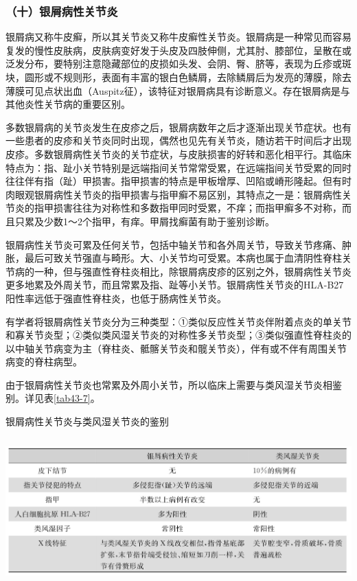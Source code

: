 \subsubsection{（十）银屑病性关节炎}

银屑病又称牛皮癣，所以其关节炎又称牛皮癣性关节炎。银屑病是一种常见而容易复发的慢性皮肤病，皮肤病变好发于头皮及四肢伸侧，尤其肘、膝部位，呈散在或泛发分布，要特别注意隐藏部位的皮损如头发、会阴、臀、脐等，表现为丘疹或斑块，圆形或不规则形，表面有丰富的银白色鳞屑，去除鳞屑后为发亮的薄膜，除去薄膜可见点状出血（Auspitz征），该特征对银屑病具有诊断意义。存在银屑病是与其他炎性关节病的重要区别。

多数银屑病的关节炎发生在皮疹之后，银屑病数年之后才逐渐出现关节症状。也有一些患者的皮疹和关节炎同时出现，偶然也见先有关节炎，随访若干时间后才出现皮疹。多数银屑病性关节炎的关节症状，与皮肤损害的好转和恶化相平行。其临床特点为：指、趾小关节特别是远端指间关节常常受累，在远端指间关节受累的同时往往伴有指（趾）甲损害。指甲损害的特点是甲板增厚、凹陷或嵴形隆起。但有时肉眼观银屑病性关节炎的指甲损害与指甲癣不易区别，其特点之一是：银屑病性关节炎的指甲损害往往为对称性和多数指甲同时受累，不痒；而指甲癣多不对称，而且只累及少数1～2个指甲，有痒。甲屑找癣菌有助于鉴别诊断。

银屑病性关节炎可累及任何关节，包括中轴关节和各外周关节，导致关节疼痛、肿胀，最后可致关节强直与畸形。大、小关节均可受累。本病也属于血清阴性脊柱关节病的一种，但与强直性脊柱炎相比，除银屑病皮疹的区别之外，银屑病性关节炎更多地累及外周关节，而且常累及指、趾等小关节。银屑病性关节炎的HLA-B27阳性率远低于强直性脊柱炎，也低于肠病性关节炎。

有学者将银屑病性关节炎分为三种类型：①类似反应性关节炎伴附着点炎的单关节和寡关节炎型；②类似类风湿关节炎的对称性多关节炎型；③类似强直性脊柱炎的以中轴关节病变为主（脊柱炎、骶髂关节炎和髋关节炎），伴有或不伴有周围关节病变的脊柱病型。

由于银屑病性关节炎也常累及外周小关节，所以临床上需要与类风湿关节炎相鉴别。详见表\ref{tab43-7}。

\begin{table}[htbp]
\centering
\caption{银屑病性关节炎与类风湿关节炎的鉴别}
\label{tab43-7}
\includegraphics[width=5.95833in,height=2.21875in]{./images/Image00264.jpg}
\end{table}

